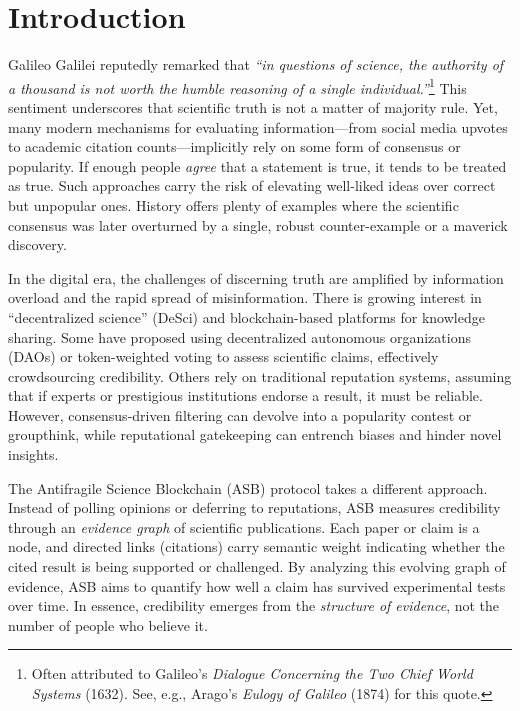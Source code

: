 \documentclass{article}
\begin{document}
\section{Introduction}
Galileo Galilei reputedly remarked that \emph{``in questions of science, the authority of a thousand is not worth the humble reasoning of a single individual.''}\footnote{Often attributed to Galileo's \emph{Dialogue Concerning the Two Chief World Systems} (1632). See, e.g., Arago's \emph{Eulogy of Galileo} (1874) for this quote.} This sentiment underscores that scientific truth is not a matter of majority rule. Yet, many modern mechanisms for evaluating information---from social media upvotes to academic citation counts---implicitly rely on some form of consensus or popularity. If enough people \emph{agree} that a statement is true, it tends to be treated as true. Such approaches carry the risk of elevating well-liked ideas over correct but unpopular ones. History offers plenty of examples where the scientific consensus was later overturned by a single, robust counter-example or a maverick discovery.

In the digital era, the challenges of discerning truth are amplified by information overload and the rapid spread of misinformation. There is growing interest in ``decentralized science'' (DeSci) and blockchain-based platforms for knowledge sharing. Some have proposed using decentralized autonomous organizations (DAOs) or token-weighted voting to assess scientific claims, effectively crowdsourcing credibility. Others rely on traditional reputation systems, assuming that if experts or prestigious institutions endorse a result, it must be reliable. However, consensus-driven filtering can devolve into a popularity contest or groupthink, while reputational gatekeeping can entrench biases and hinder novel insights.

The Antifragile Science Blockchain (ASB) protocol takes a different approach. Instead of polling opinions or deferring to reputations, ASB measures credibility through an \emph{evidence graph} of scientific publications. Each paper or claim is a node, and directed links (citations) carry semantic weight indicating whether the cited result is being supported or challenged. By analyzing this evolving graph of evidence, ASB aims to quantify how well a claim has survived experimental tests over time. In essence, credibility emerges from the \emph{structure of evidence}, not the number of people who believe it.
\end{document}
